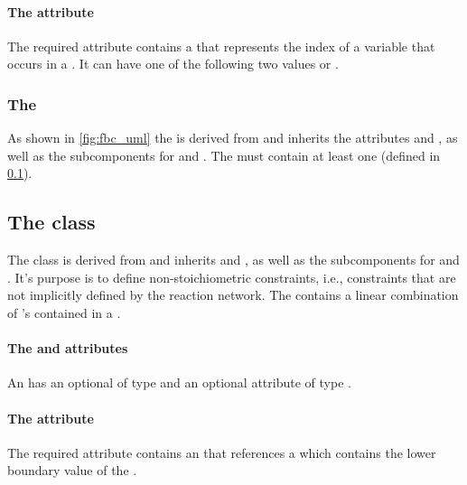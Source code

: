 \paragraph{The  attribute}
The required  attribute contains a  that
represents the index of a variable that occurs in a \FluxObjective. It can have one
of the following two values  or .

\subsubsection{The \FBC {}}
\label{listofuserconstraints-class}
As shown in \ref{fig:fbc_uml} the \ListOfUserConstraints is derived from \SBase
and inherits the attributes  and , as well as
the subcomponents for \Annotation and \Notes. The
\ListOfUserConstraints must contain at least one \UserConstraint (defined in
\ref{userconstraint-class}).

\subsection{The \FBC {} class}
\label{userconstraint-class}
\label{listoftuples-class}

The \FBC \UserConstraint class is derived from \SBML \SBase and inherits
 and , as well as the subcomponents for
\Annotation and \Notes. It's purpose is to define non-stoichiometric constraints, i.e., constraints that are not implicitly defined by the reaction network. The \UserConstraint contains a linear combination of \UserConstraintComponent's contained in a \ListOfUserConstraintComponents.

\paragraph{The  and  attributes}
An \Objective has an optional  of type
 and an optional attribute  of type .

\paragraph{The  attribute}
The required  attribute contains an  that references a \Parameter which contains the lower boundary value of the \UserConstraint.

